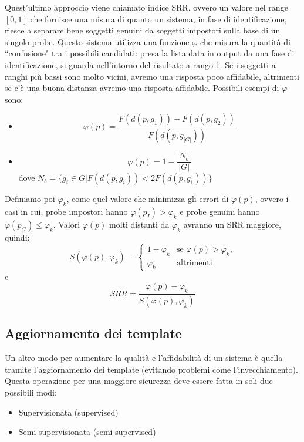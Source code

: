 \documentclass{article}
\begin{document}
\bigskip
Quest'ultimo approccio viene chiamato indice SRR, ovvero un valore nel range $[0,1]$ che fornisce una misura di quanto un sistema, in fase di identificazione, riesce a separare bene soggetti genuini da soggetti impostori sulla base di un singolo probe. Questo sistema utilizza una funzione $\varphi$ che misura la quantità di ``confusione" tra i possibili candidati: presa la lista data in output da una fase di identificazione, si guarda nell'intorno del risultato a rango 1. Se i soggetti a ranghi più bassi sono molto vicini, avremo una risposta poco affidabile, altrimenti se c'è una buona distanza avremo una risposta affidabile. Possibili esempi di $\varphi$ sono:
\begin{itemize}
    \item $$\varphi(p) = \frac{F(d(p, g_1)) - F(d(p, g_2))}{F(d(p, g_{|G|}))}$$
    \item $$\varphi(p) = 1 - \frac{|N_b|}{|G|}$$ dove $N_b = \{g_i \in G | F(d(p, g_i)) < 2F(d(p, g_1)) \}$
\end{itemize}

Definiamo poi $\varphi_k$, come quel valore che minimizza gli errori di $\varphi(p)$, ovvero i casi in cui, probe impostori hanno $\varphi(p_I) > \varphi_k$ e probe genuini hanno $\varphi(p_G) \leq \varphi_k$. Valori $\varphi(p)$ molti distanti da $\varphi_k$ avranno un SRR maggiore, quindi:
\[
S(\varphi(p), \varphi_k) =
\begin{cases}
1-\varphi_k  & \text{se $\varphi(p)>\varphi_k$,} \\
\varphi_k & \text{altrimenti} 
\end{cases}
\]
e $$SRR = \frac{\varphi(p) - \varphi_k}{S(\varphi(p), \varphi_k)}$$

\subsection{Aggiornamento dei template}
Un altro modo per aumentare la qualità e l'affidabilità di un sistema è quella tramite l'aggiornamento dei template (evitando problemi come l'invecchiamento). Questa operazione per una maggiore sicurezza deve essere fatta in soli due possibili modi:
\begin{itemize}
    \item Supervisionata (supervised)
    \item Semi-supervisionata (semi-supervised)
\end{itemize}
\end{document}
